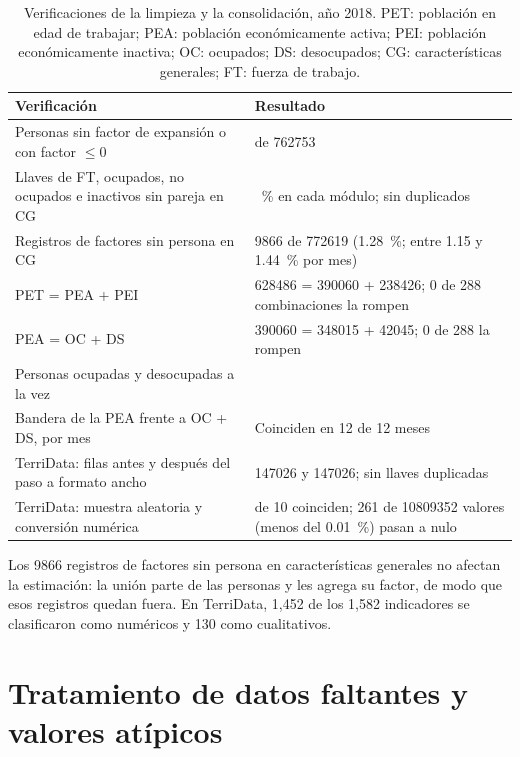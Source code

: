 \begin{table}[!htbp]
\centering
\small
\caption{Verificaciones de la limpieza y la consolidación, año 2018. PET: población en edad de trabajar; PEA: población económicamente activa; PEI: población económicamente inactiva; OC: ocupados; DS: desocupados; CG: características generales; FT: fuerza de trabajo.}
\label{tab:res_limpieza}
\begin{tabularx}{\linewidth}{>{\raggedright\arraybackslash}X >{\raggedright\arraybackslash}p{5.6cm}}
\toprule
Verificación & Resultado \\
\midrule
Personas sin factor de expansión o con factor $\leq 0$ & 0 de \num{762753} \\
Llaves de FT, ocupados, no ocupados e inactivos sin pareja en CG & 0~\% en cada módulo; sin duplicados \\
Registros de factores sin persona en CG & \num{9866} de \num{772619} (1.28~\%; entre 1.15 y 1.44~\% por mes) \\
PET = PEA + PEI & \num{628486} = \num{390060} + \num{238426}; 0 de 288 combinaciones la rompen \\
PEA = OC + DS & \num{390060} = \num{348015} + \num{42045}; 0 de 288 la rompen \\
Personas ocupadas y desocupadas a la vez & 0 \\
Bandera de la PEA frente a OC + DS, por mes & Coinciden en 12 de 12 meses \\
TerriData: filas antes y después del paso a formato ancho & \num{147026} y \num{147026}; sin llaves duplicadas \\
TerriData: muestra aleatoria y conversión numérica & 10 de 10 coinciden; 261 de \num{10809352} valores (menos del 0.01~\%) pasan a nulo \\
\bottomrule
\end{tabularx}
\end{table}

Los \num{9866} registros de factores sin persona en características generales no afectan la estimación: la unión parte de las personas y les agrega su factor, de modo que esos registros quedan fuera. En TerriData, 1,452 de los 1,582 indicadores se clasificaron como numéricos y 130 como cualitativos.

\section{Tratamiento de datos faltantes y valores atípicos}
\label{sec:res_faltantes}

